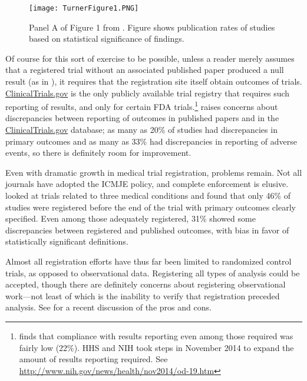 \documentclass[12pt] {article}
\begin{document}
\begin{figure}
\begin{center}
\texttt{[image: TurnerFigure1.PNG]}
\end{center}
\caption{Panel A of Figure 1 from \cite{turner_selective_2008}. Figure shows publication rates of studies based on statistical significance of findings.}
\label{fig:turner}
\end{figure}
Of course for this sort of exercise to be possible, unless a reader
merely assumes that a registered trial without an associated published
paper produced a null result (as in \cite{rosenthal1979file}), it requires that the registration site
itself obtain outcomes of trials. \href{http://www.clinicaltrials.gov}{ClinicalTrials.gov} is the only
publicly available trial registry that requires such reporting of
results, and only for certain FDA trials.\footnote{\cite{resultscompliance} finds that compliance with results reporting even among those required was fairly low (22\%). HHS and NIH took steps in November 2014 to expand the amount of results reporting required. See \url{http://www.nih.gov/news/health/nov2014/od-19.htm}}  \cite{hartung_reporting_2014} raises
concerns about discrepancies between reporting of outcomes in published
papers and in the \href{http://www.clinicaltrials.gov}{ClinicalTrials.gov} database; as many as 20\% of
studies had discrepancies in primary outcomes and as many as 33\% had
discrepancies in reporting of adverse events, so there is definitely room for improvement. 

Even with dramatic growth in medical trial registration, problems
remain. Not all journals have adopted the ICMJE policy, and complete
enforcement is elusive. \cite{mathieu_s_comparison_2009} looked at trials related
to three medical conditions and found that only 46\% of studies were
registered before the end of the trial with primary outcomes clearly
specified. Even among those adequately registered, 31\% showed some
discrepancies between registered and published outcomes, with bias in
favor of statistically significant definitions.

Almost all registration efforts have thus far been limited to randomized
control trials, as opposed to observational data. Registering all types of analysis could be accepted, though there are definitely concerns about registering observational work---not least of which is the inability to verify that registration preceded analysis. See \cite{dal-re_making_2014} for a recent discussion of the pros and cons.
 
\end{document}
